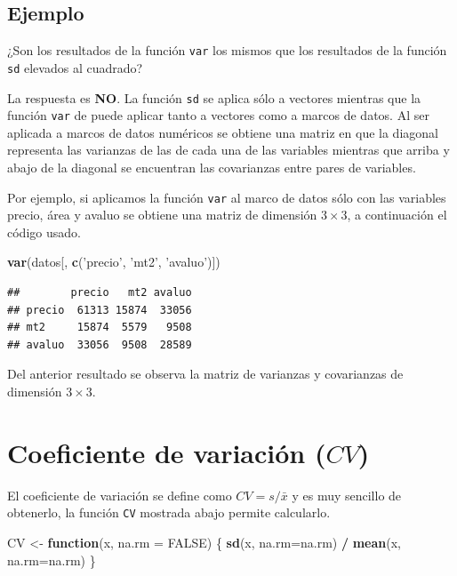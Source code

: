 \documentclass[10pt,]{krantz}
\makeatletter
\newenvironment{Shaded}{\begin{snugshade}}{\end{snugshade}}
\newcommand{\KeywordTok}[1]{\textcolor[rgb]{0.13,0.29,0.53}{\textbf{#1}}}
\newcommand{\DataTypeTok}[1]{\textcolor[rgb]{0.13,0.29,0.53}{#1}}
\newcommand{\StringTok}[1]{\textcolor[rgb]{0.31,0.60,0.02}{#1}}
\newcommand{\OtherTok}[1]{\textcolor[rgb]{0.56,0.35,0.01}{#1}}
\newcommand{\ControlFlowTok}[1]{\textcolor[rgb]{0.13,0.29,0.53}{\textbf{#1}}}
\newcommand{\OperatorTok}[1]{\textcolor[rgb]{0.81,0.36,0.00}{\textbf{#1}}}
\newcommand{\NormalTok}[1]{#1}
\newenvironment{kframe}{%
\medskip{}
\setlength{\fboxsep}{.8em}
 \def\at@end@of@kframe{}%
 \ifinner\ifhmode%
  \def\at@end@of@kframe{\end{minipage}}%
  \begin{minipage}{\columnwidth}%
 \fi\fi%
 \def\FrameCommand##1{\hskip\@totalleftmargin \hskip-\fboxsep
 \colorbox{shadecolor}{##1}\hskip-\fboxsep
     \hskip-\linewidth \hskip-\@totalleftmargin \hskip\columnwidth}%
 \MakeFramed {\advance\hsize-\width
   \@totalleftmargin\z@ \linewidth\hsize
   \@setminipage}}%
 {\par\unskip\endMakeFramed%
 \at@end@of@kframe}
\renewenvironment{Shaded}{\begin{kframe}}{\end{kframe}}
\makeatother
\begin{document}
\subsection*{Ejemplo}\label{ejemplo-40}


¿Son los resultados de la función \texttt{var} los mismos que los
resultados de la función \texttt{sd} elevados al cuadrado?

La respuesta es \textbf{NO}. La función \texttt{sd} se aplica sólo a
vectores mientras que la función \texttt{var} de puede aplicar tanto a
vectores como a marcos de datos. Al ser aplicada a marcos de datos
numéricos se obtiene una matriz en que la diagonal representa las
varianzas de las de cada una de las variables mientras que arriba y
abajo de la diagonal se encuentran las covarianzas entre pares de
variables.

Por ejemplo, si aplicamos la función \texttt{var} al marco de datos sólo
con las variables precio, área y avaluo se obtiene una matriz de
dimensión \(3 \times 3\), a continuación el código usado.

\begin{Shaded}
\begin{Highlighting}[]
\KeywordTok{var}\NormalTok{(datos[, }\KeywordTok{c}\NormalTok{(}\StringTok{'precio'}\NormalTok{, }\StringTok{'mt2'}\NormalTok{, }\StringTok{'avaluo'}\NormalTok{)])}
\end{Highlighting}
\end{Shaded}

\begin{verbatim}
##        precio   mt2 avaluo
## precio  61313 15874  33056
## mt2     15874  5579   9508
## avaluo  33056  9508  28589
\end{verbatim}

Del anterior resultado se observa la matriz de varianzas y covarianzas
de dimensión \(3 \times 3\).

\section{\texorpdfstring{Coeficiente de variación (\(CV\))
}{Coeficiente de variación (CV) }}\label{coeficiente-de-variacion-cv}

El coeficiente de variación se define como \(CV=s/\bar{x}\) y es muy
sencillo de obtenerlo, la función \texttt{CV} mostrada abajo permite
calcularlo.

\begin{Shaded}
\begin{Highlighting}[]
\NormalTok{CV <-}\StringTok{ }\ControlFlowTok{function}\NormalTok{(x, }\DataTypeTok{na.rm =} \OtherTok{FALSE}\NormalTok{) \{}
  \KeywordTok{sd}\NormalTok{(x, }\DataTypeTok{na.rm=}\NormalTok{na.rm) }\OperatorTok{/}\StringTok{ }\KeywordTok{mean}\NormalTok{(x, }\DataTypeTok{na.rm=}\NormalTok{na.rm)}
\NormalTok{\}}
\end{Highlighting}
\end{Shaded}
\end{document}

